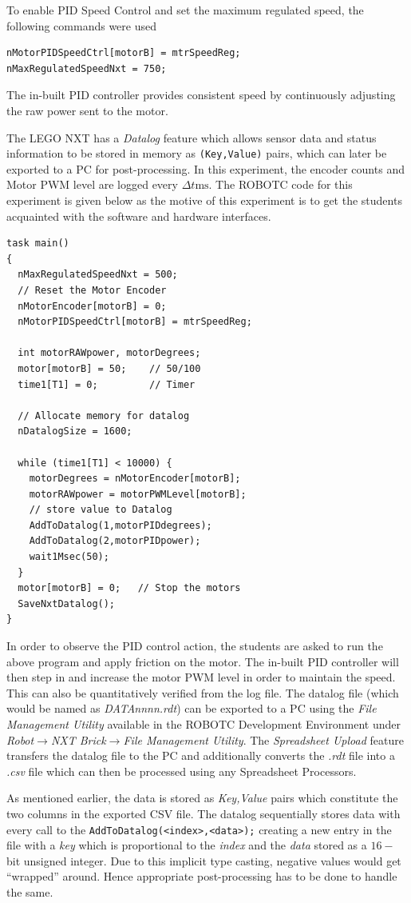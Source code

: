 \documentclass[a4paper,10pt]{article}
\begin{document}
To enable PID Speed Control and set the maximum regulated speed, the following commands were used
\begin{verbatim}
nMotorPIDSpeedCtrl[motorB] = mtrSpeedReg;
nMaxRegulatedSpeedNxt = 750;
\end{verbatim}
The in-built PID controller provides consistent speed by continuously adjusting the raw power sent to the motor.

The LEGO NXT has a \emph{Datalog} feature which allows sensor data and status information to be stored in memory as \verb|(Key,Value)| pairs, which can later be exported to a PC for post-processing. In this experiment, the encoder counts and Motor PWM level are logged every $\Delta{}t  \text{ms}$. The ROBOTC code for this experiment is given below as the motive of this experiment is to get the students acquainted with the software and hardware interfaces. 
\begin{verbatim}
task main()
{
  nMaxRegulatedSpeedNxt = 500;
  // Reset the Motor Encoder
  nMotorEncoder[motorB] = 0;
  nMotorPIDSpeedCtrl[motorB] = mtrSpeedReg;

  int motorRAWpower, motorDegrees;
  motor[motorB] = 50;    // 50/100
  time1[T1] = 0;         // Timer

  // Allocate memory for datalog
  nDatalogSize = 1600;

  while (time1[T1] < 10000) {
    motorDegrees = nMotorEncoder[motorB];
    motorRAWpower = motorPWMLevel[motorB];     
    // store value to Datalog
    AddToDatalog(1,motorPIDdegrees);
    AddToDatalog(2,motorPIDpower);
    wait1Msec(50);
  }
  motor[motorB] = 0;   // Stop the motors
  SaveNxtDatalog();
}
\end{verbatim}

In order to observe the PID control action, the students are asked to run the above program and apply friction on the motor. The in-built PID controller will then step in and increase the motor PWM level in order to maintain the speed. This can also be quantitatively verified from the log file. The datalog file (which would be named as \emph{DATAnnnn.rdt}) can be exported to a PC using the \emph{File Management Utility} available in the ROBOTC Development Environment under \emph{Robot$\to$NXT Brick$\to$File Management Utility}. The \emph{Spreadsheet Upload} feature transfers the datalog file to the PC and additionally converts the \emph{.rdt} file into a \emph{.csv} file which can then be processed using any Spreadsheet Processors.

As mentioned earlier, the data is stored as \emph{Key,Value} pairs which constitute the two columns in the exported CSV file. The datalog sequentially stores data with every call to the \verb|AddToDatalog(<index>,<data>);| creating a new entry in the file with a \emph{key} which is proportional to the \emph{index} and the \emph{data} stored as a $16-$bit unsigned integer. Due to this implicit type casting, negative values would get ``wrapped'' around. Hence appropriate post-processing has to be done to handle the same.
\end{document}
